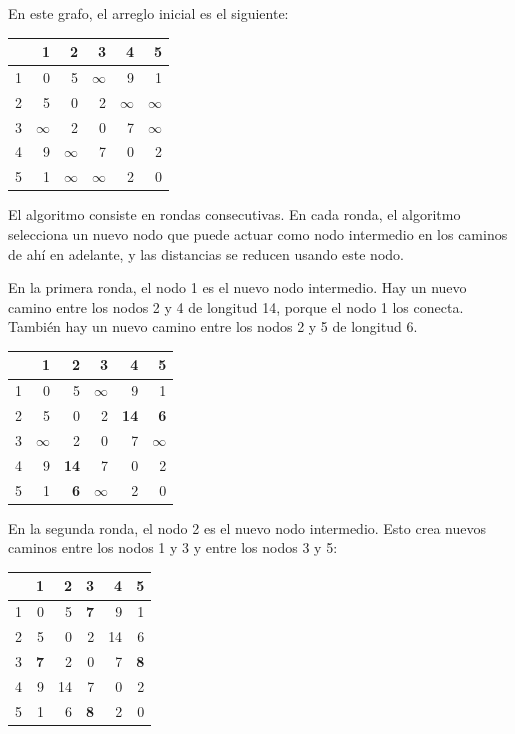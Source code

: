 En este grafo, el arreglo inicial es el siguiente:
\begin{center}
\begin{tabular}{r|rrrrr}
 & 1 & 2 & 3 & 4 & 5 \\
\hline
1 & 0 & 5 & $\infty$ & 9 & 1 \\
2 & 5 & 0 & 2 & $\infty$ & $\infty$ \\
3 & $\infty$ & 2 & 0 & 7 & $\infty$ \\
4 & 9 & $\infty$ & 7 & 0 & 2 \\
5 & 1 & $\infty$ & $\infty$ & 2 & 0 \\
\end{tabular}
\end{center}
\vspace{10pt}
El algoritmo consiste en rondas consecutivas.
En cada ronda, el algoritmo selecciona un nuevo nodo
que puede actuar como nodo intermedio en los caminos de ahí en adelante,
y las distancias se reducen usando este nodo.

En la primera ronda, el nodo 1 es el nuevo nodo intermedio.
Hay un nuevo camino entre los nodos 2 y 4
de longitud 14, porque el nodo 1 los conecta.
También hay un nuevo camino
entre los nodos 2 y 5 de longitud 6.

\begin{center}
\begin{tabular}{r|rrrrr}
 & 1 & 2 & 3 & 4 & 5 \\
\hline
1 & 0 & 5 & $\infty$ & 9 & 1 \\
2 & 5 & 0 & 2 & \textbf{14} & \textbf{6} \\
3 & $\infty$ & 2 & 0 & 7 & $\infty$ \\
4 & 9 & \textbf{14} & 7 & 0 & 2 \\
5 & 1 & \textbf{6} & $\infty$ & 2 & 0 \\
\end{tabular}
\end{center}
\vspace{10pt}

En la segunda ronda, el nodo 2 es el nuevo nodo intermedio.
Esto crea nuevos caminos entre los nodos 1 y 3
y entre los nodos 3 y 5:

\begin{center}
\begin{tabular}{r|rrrrr}
 & 1 & 2 & 3 & 4 & 5 \\
\hline
1 & 0 & 5 & \textbf{7} & 9 & 1 \\
2 & 5 & 0 & 2 & 14 & 6 \\
3 & \textbf{7} & 2 & 0 & 7 & \textbf{8} \\
4 & 9 & 14 & 7 & 0 & 2 \\
5 & 1 & 6 & \textbf{8} & 2 & 0 \\
\end{tabular}
\end{center}
\vspace{10pt}


